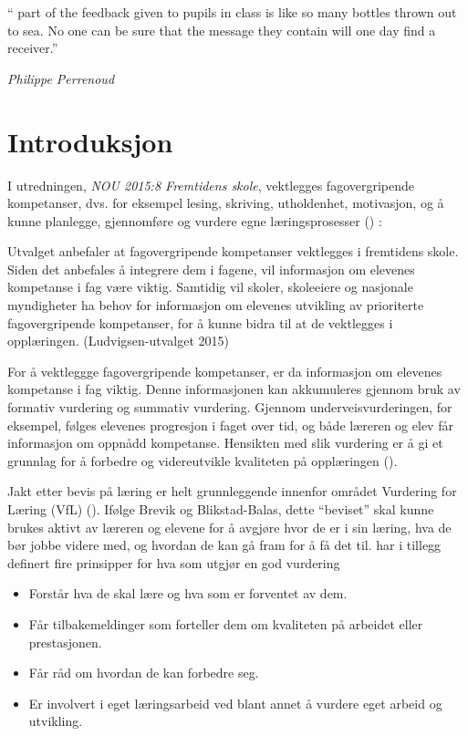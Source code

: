 \documentclass[main.tex]{subfiles}
\begin{document}
\setlength{\epigraphwidth}{0.8\textwidth}
\epigraph{``\textelp{} part of the feedback given to pupils in class is like so many 
bottles thrown out to sea. No one can be sure that the message they contain will one day 
find a receiver.''}
{\textit{Philippe Perrenoud}}

\section*{Introduksjon}
I utredningen, \emph{NOU 2015:8 Fremtidens skole}, vektlegges fagovergripende kompetanser, dvs. 
for eksempel lesing, skriving, utholdenhet, motivasjon, og å kunne planlegge, 
gjennomføre og vurdere egne læringsprosesser () :
\begin{displayquote}
Utvalget anbefaler at fagovergripende kompetanser vektlegges i fremtidens skole. Siden det  
anbefales å integrere dem i fagene, vil informasjon om elevenes kompetanse i fag være viktig.  
Samtidig vil skoler, skoleeiere og nasjonale myndigheter ha behov for informasjon om elevenes utvikling av 
prioriterte fagovergripende kompetanser, for å kunne bidra til at de vektlegges i opplæringen. 
(Ludvigsen-utvalget 2015)
\end{displayquote}
For å vektleggge fagovergripende kompetanser, er da informasjon om elevenes kompetanse i fag viktig. 
Denne informasjonen kan akkumuleres gjennom bruk av formativ vurdering og summativ vurdering.
Gjennom underveisvurderingen, for eksempel, følges elevenes progresjon i faget over tid, og både læreren 
og elev får informasjon om oppnådd kompetanse. Hensikten med slik vurdering er å gi et grunnlag for å 
forbedre og videreutvikle kvaliteten på opplæringen ().

Jakt etter bevis på læring er helt grunnleggende innenfor området Vurdering for Læring (VfL)
(). Ifølge Brevik og Blikstad-Balas, dette ``beviset'' skal kunne brukes aktivt
av læreren og elevene for å avgjøre hvor de er i sin læring, hva de bør jobbe videre med, og
hvordan de kan gå fram for å få det til.  har i tillegg definert fire
prinsipper for hva som utgjør en god vurdering 
\begin{itemize}
\item Forstår hva de skal lære og hva som er forventet av dem.
\item Får tilbakemeldinger som forteller dem om kvaliteten på arbeidet eller prestasjonen.
\item Får råd om hvordan de kan forbedre seg.
\item Er involvert i eget læringsarbeid ved blant annet å vurdere eget arbeid og utvikling.
\end{itemize}
\end{document}
